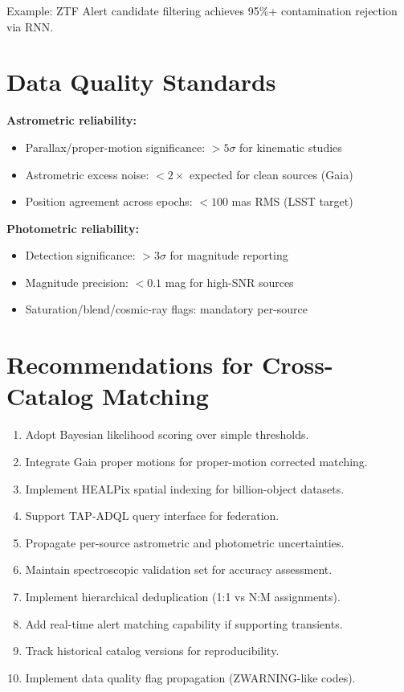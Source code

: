 \documentclass[11pt,twocolumn]{article}
\begin{document}
Example: ZTF Alert candidate filtering achieves 95\%+ contamination rejection via RNN.

\section{Data Quality Standards}

\textbf{Astrometric reliability:}
\begin{itemize}
\item Parallax/proper-motion significance: $> 5\sigma$ for kinematic studies
\item Astrometric excess noise: $< 2\times$ expected for clean sources (Gaia)
\item Position agreement across epochs: $< 100$ mas RMS (LSST target)
\end{itemize}

\textbf{Photometric reliability:}
\begin{itemize}
\item Detection significance: $> 3\sigma$ for magnitude reporting
\item Magnitude precision: $< 0.1$ mag for high-SNR sources
\item Saturation/blend/cosmic-ray flags: mandatory per-source
\end{itemize}

\section{Recommendations for Cross-Catalog Matching}

\begin{enumerate}
\item Adopt Bayesian likelihood scoring over simple thresholds.
\item Integrate Gaia proper motions for proper-motion corrected matching.
\item Implement HEALPix spatial indexing for billion-object datasets.
\item Support TAP-ADQL query interface for federation.
\item Propagate per-source astrometric and photometric uncertainties.
\item Maintain spectroscopic validation set for accuracy assessment.
\item Implement hierarchical deduplication (1:1 vs N:M assignments).
\item Add real-time alert matching capability if supporting transients.
\item Track historical catalog versions for reproducibility.
\item Implement data quality flag propagation (ZWARNING-like codes).
\end{enumerate}
\end{document}
